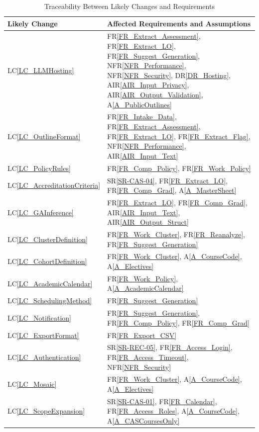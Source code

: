 \documentclass[12pt]{article}
\newcommand{\srref}[1]{SR\ref{#1}}
\newcommand{\rref}[1]{FR\ref{#1}}
\newcommand{\nfrref}[1]{NFR\ref{#1}}
\newcommand{\lcref}[1]{LC\ref{#1}}
\newcommand{\drref}[1]{DR\ref{#1}}
\newcommand{\airref}[1]{AIR\ref{#1}}
\newcommand{\asref}[1]{A\ref{#1}}
\begin{document}
\begin{table}[H]
\centering
\small
\renewcommand{\arraystretch}{1.2}
\begin{tabular}{>{\raggedright\arraybackslash}p{} >{\raggedright\arraybackslash}p{}}
\toprule
\textbf{Likely Change} & \textbf{Affected Requirements and Assumptions} \\
\midrule
\lcref{LC_LLMHosting} & \rref{FR_Extract_Assessment}, \rref{FR_Extract_LO}, \rref{FR_Suggest_Generation}, \nfrref{NFR_Performance}, \nfrref{NFR_Security}, \drref{DR_Hosting}, \airref{AIR_Input_Privacy}, \airref{AIR_Output_Validation}, \asref{A_PublicOutlines} \\
\lcref{LC_OutlineFormat} & \rref{FR_Intake_Data}, \rref{FR_Extract_Assessment}, \rref{FR_Extract_LO}, \rref{FR_Extract_Flag}, \nfrref{NFR_Performance}, \airref{AIR_Input_Text} \\
\lcref{LC_PolicyRules} & \rref{FR_Comp_Policy}, \rref{FR_Work_Policy} \\
\lcref{LC_AccreditationCriteria} & \srref{SR-CAS-04}, \rref{FR_Extract_LO}, \rref{FR_Comp_Grad}, \asref{A_MasterSheet} \\
\lcref{LC_GAInference} & \rref{FR_Extract_LO}, \rref{FR_Comp_Grad}, \airref{AIR_Input_Text}, \airref{AIR_Output_Struct} \\
\lcref{LC_ClusterDefinition} & \rref{FR_Work_Cluster}, \rref{FR_Reanalyze}, \rref{FR_Suggest_Generation} \\
\lcref{LC_CohortDefinition} & \rref{FR_Work_Cluster}, \asref{A_CourseCode}, \asref{A_Electives} \\
\lcref{LC_AcademicCalendar} & \rref{FR_Work_Policy}, \asref{A_AcademicCalendar} \\
\lcref{LC_SchedulingMethod} & \rref{FR_Suggest_Generation} \\
\lcref{LC_Notification} & \rref{FR_Suggest_Generation}, \rref{FR_Comp_Policy}, \rref{FR_Comp_Grad} \\
\lcref{LC_ExportFormat} & \rref{FR_Export_CSV} \\
\lcref{LC_Authentication} & \srref{SR-REC-05}, \rref{FR_Access_Login}, \rref{FR_Access_Timeout}, \nfrref{NFR_Security} \\
\lcref{LC_Mosaic} & \rref{FR_Work_Cluster}, \asref{A_CourseCode}, \asref{A_Electives} \\
\lcref{LC_ScopeExpansion} & \srref{SR-CAS-01}, \rref{FR_Calendar}, \rref{FR_Access_Roles}, \asref{A_CourseCode}, \asref{A_CASCoursesOnly} \\
\bottomrule
\end{tabular}
\caption{Traceability Between Likely Changes and Requirements}
\label{tab:LC2Rtm}
\end{table}
\end{document}
